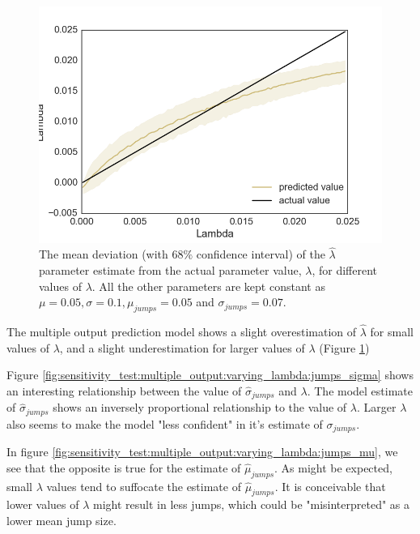 \documentclass[11pt,oneside,openany,a4paper,english, report, goldenblock
]{usthesis}
\begin{document}
\begin{figure}[h]
	\centering
	\includegraphics[width=0.5\linewidth]{Images/Output-Sensitivity-Results/ConvolutionalNN-MultipleOutput-ELU/Varying-Lambda/Lambda}
	\caption{The mean deviation (with $68\%$ confidence interval) of the $\hat{\lambda}$ parameter estimate from the actual parameter value, $\lambda$, for different values of $\lambda$. All the other parameters are kept constant as $\mu = 0.05, \sigma = 0.1, \mu_{jumps} = 0.05$ and $\sigma_{jumps} = 0.07$.}
	\label{fig:sensitivity_test:multiple_output:varying_lambda:lambda}
\end{figure}

The multiple output prediction model shows a slight overestimation of $\hat{\lambda}$ for small values of $\lambda$, and a slight underestimation for larger values of $\lambda$ (Figure \ref{fig:sensitivity_test:multiple_output:varying_lambda:lambda})

Figure \ref{fig:sensitivity_test:multiple_output:varying_lambda:jumps_sigma} shows an interesting relationship between the value of $\hat{\sigma}_{jumps}$ and $\lambda$. The model estimate of $\hat{\sigma}_{jumps}$ shows an inversely proportional relationship to the value of $\lambda$. Larger $\lambda$ also seems to make the model "less confident" in it's estimate of $\sigma_{jumps}$.

In figure \ref{fig:sensitivity_test:multiple_output:varying_lambda:jumps_mu}, we see that the opposite is true for the estimate of $\hat{\mu}_{jumps}$. As might be expected, small $\lambda$ values tend to suffocate the estimate of $\hat{\mu}_{jumps}$. It is conceivable that lower values of $\lambda$ might result in less jumps, which could be "misinterpreted" as a lower mean jump size.
\end{document}
